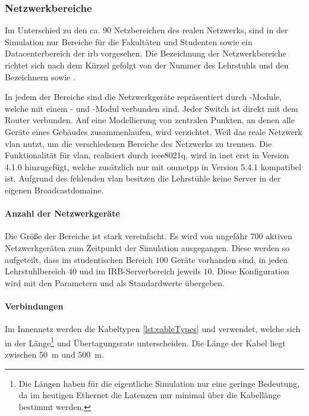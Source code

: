 \subsubsection{Netzwerkbereiche}
\begin{program}[t]
	}]{tucsnet/tucsnetwork.ned}
	\caption{Verwendete Kabeltypen um die Geräte in dem \ned{tucsnet} zu verbinden.}
	\label{lst:cableTypes}
\end{program}
Im Unterschied zu den {ca.} 90 Netzbereichen des realen Netzwerks, sind in der Simulation nur Bereiche für die Fakultäten und Studenten sowie ein Datacenterbereich der \gls{irb} vorgesehen. Die Bezeichnung der Netzwerkbereiche richtet sich nach dem Kürzel  gefolgt von der Nummer des Lehrstuhls  und den Bezeichnern  sowie . 

In jedem der Bereiche sind die Netzwerkgeräte repräsentiert durch -Module, welche mit einem - und -Modul verbunden sind. Jeder Switch ist direkt mit dem Router verbunden. Auf eine Modellierung von zentralen Punkten, an denen alle Geräte eines Gebäudes zusammenlaufen, wird verzichtet. Weil das reale Netzwerk \gls{vlan} nutzt, um die verschiedenen Bereiche des Netzwerks zu trennen. Die Funktionalität für \gls{vlan}, realisiert durch \gls{ieee8021q}, wird in \gls{inet} erst in Version 4.1.0 \cite{InetReleases} hinzugefügt, welche zusätzlich nur mit \gls{omnetpp} in Version 5.4.1 kompatibel ist. Aufgrund des fehlenden \gls{vlan} besitzen die Lehrstühle keine Server in der eigenen Broadcastdomaine.

\paragraph{Anzahl der Netzwerkgeräte}
Die Größe der Bereiche ist stark vereinfacht. Es wird von ungefähr $700$ aktiven Netzwerkgeräten zum Zeitpunkt der Simulation ausgegangen. Diese werden so aufgeteilt, dass im studentischen Bereich $100$ Geräte vorhanden sind, in jeden Lehrstuhlbereich $40$ und im IRB-Serverbereich jeweils $10$. Diese Konfiguration wird mit den Parametern  und  als Standardwerte übergeben.

\paragraph{Verbindungen}
Im Innennetz werden die Kabeltypen \ref{lst:cableTypes}  und  verwendet, welche sich in der Länge\footnote{Die Längen haben für die eigentliche Simulation nur eine geringe Bedeutung, da im heutigen Ethernet die Latenzen nur minimal über die Kabellänge bestimmt werden.} und Übertagungsrate unterscheiden. Die Länge der Kabel liegt zwischen \SI{50}{\metre} und \SI{500}{\metre}.


